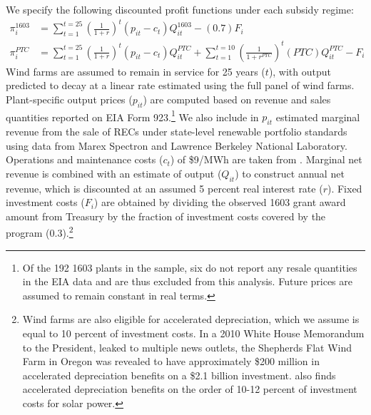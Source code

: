 \documentclass[12pt]{article}
\begin{document}
We specify the following discounted profit functions under each subsidy regime:
\begin{align*}
\pi_i^{1603}&=\sum_{t=1}^{t=25}\left(\frac{1}{1+r}\right)^{t}(p_{it}-c_{t})Q_{it}^{1603}-(0.7)F_i \\
\pi_i^{PTC}&=\sum_{t=1}^{t=25}\left(\frac{1}{1+r}\right)^{t}(p_{it}-c_{t})Q_{it}^{PTC}+\sum_{t=1}^{t=10}\left(\frac{1}{1+r^{PTC}}\right)^{t}(PTC)Q_{it}^{PTC}-F_i
\end{align*}
Wind farms are assumed to remain in service for 25 years ($t$), with output predicted to decay at a linear rate estimated using the full panel of wind farms. Plant-specific output prices ($p_{it}$) are computed based on revenue and sales quantities reported on EIA Form 923.\footnote{Of the 192 1603 plants in the sample, six do not report any resale quantities in the EIA data and are thus excluded from this analysis. Future prices are assumed to remain constant in real terms.} We also include in $p_{it}$ estimated marginal revenue from the sale of RECs under state-level renewable portfolio standards using data from Marex Spectron and Lawrence Berkeley National Laboratory. Operations and maintenance costs ($c_{t}$) of \$9/MWh are taken from \citet{wiser_2015_2016}. Marginal net revenue is combined with an estimate of output ($Q_{it}$) to construct annual net revenue, which is discounted at an assumed 5 percent real interest rate ($r$). Fixed investment costs ($F_i$) are obtained by dividing the observed 1603 grant award amount from Treasury by the fraction of investment costs covered by the program (0.3).\footnote{Wind farms are also eligible for accelerated depreciation, which we assume is equal to 10 percent of investment costs. In a 2010 White House Memorandum to the President, leaked to multiple news outlets, the Shepherds Flat Wind Farm in Oregon was revealed to have approximately \$200 million in accelerated depreciation benefits on a \$2.1 billion investment. \citet{borenstein_private_2015} also finds accelerated depreciation benefits on the order of 10-12 percent of investment costs for solar power. } 
\end{document}
